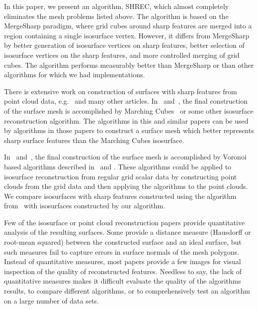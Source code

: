 In this paper, we present an algorithm, SHREC,
which almost completely eliminates the mesh problems listed above.
The algorithm is based on the MergeSharp paradigm,
where grid cubes around sharp features are merged
into a region containing a single isosurface vertex.
However, it differs from MergeSharp by better generation
of isosurface vertices on sharp features,
better selection of isosurface vertices on the sharp features,
and more controlled merging of grid cubes.
The algorithm performs measurably better
than MergeSharp or than other algorithms for which we had implementations.

There is extensive work on construction of surfaces with sharp features 
from point cloud data,
e.g.~\cite{avron2010L,cdr-drpsc-07,Daniels:2007:Robust,dgqsww-fprss-12,
fcs-rmlsf-2005,Oztireli2009,sym-fpmg-10,Wang:2013:Feature}
and many other articles.
In~\cite{Oztireli2009} and~\cite{Wang:2013:Feature},
the final construction of the surface mesh is accomplished 
by Marching Cubes~\cite{lc-mchr3-87}
or some other isosurface reconstruction algorithm.
The algorithms in this and similar papers
can be used by algorithms in those papers
to construct a surface mesh which better represents sharp surface features
than the Marching Cubes isosurface.

In~\cite{cdr-drpsc-07,dgqsww-fprss-12} and~\cite{sym-fpmg-10},
the final construction of the surface mesh is accomplished
by Voronoi based algorithms described 
in~\cite{cdr-drpsc-07} and \cite{dgqsww-fprss-12}.
These algorithms could be applied to isosurface reconstruction
from regular grid scalar data
by constructing point clouds from the grid data
and then applying the algorithms to the point clouds.
We compare isosurfaces with sharp features constructed
using the algorithm from~\cite{dgqsww-fprss-12}
with isosurfaces constructed by our algorithm.

Few of the isosurface or point cloud reconstruction papers
provide quantitative analysis of the resulting surfaces.
Some provide a distance measure (Hausdorff or root-mean squared)
between the constructed surface and an ideal surface,
but such measures fail to capture errors in surface normals
of the mesh polygons.
Instead of quantitative measures,
most papers provide a few images for visual inspection
of the quality of reconstructed features.
Needless to say, the lack of quantitative measures makes it
difficult evaluate the quality of the algorithms results,
to compare different algorithms,
or to comprehensively test an algorithm on a large number of data sets.

